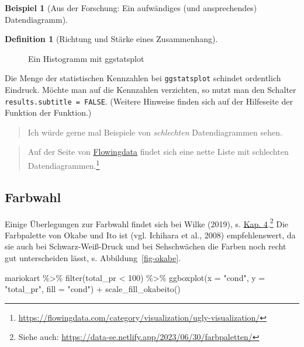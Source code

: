 \documentclass[
  a4paper,
]{scrbook}
\newenvironment{Shaded}{\begin{snugshade}}{\end{snugshade}}
\newcommand{\AttributeTok}[1]{\textcolor[rgb]{0.40,0.45,0.13}{#1}}
\newcommand{\DecValTok}[1]{\textcolor[rgb]{0.68,0.00,0.00}{#1}}
\newcommand{\FunctionTok}[1]{\textcolor[rgb]{0.28,0.35,0.67}{#1}}
\newcommand{\NormalTok}[1]{\textcolor[rgb]{0.00,0.23,0.31}{#1}}
\newcommand{\SpecialCharTok}[1]{\textcolor[rgb]{0.37,0.37,0.37}{#1}}
\newcommand{\StringTok}[1]{\textcolor[rgb]{0.13,0.47,0.30}{#1}}
\theoremstyle{definition}
\newtheorem{example}{Beispiel}[chapter]
\theoremstyle{definition}
\newtheorem{definition}{Definition}[chapter]
\theoremstyle{definition}
\theoremstyle{remark}
\begin{document}
\begin{example}[Aus der Forschung: Ein aufwändiges (und ansprechendes)
Datendiagramm]
\begin{definition}[Richtung und Stärke eines
Zusammenhang]
\begin{figure}[H]
{}

\caption{\label{fig-ggstatsplot}Ein Histogramm mit ggstatsplot}

\end{figure}%

Die Menge der statistischen Kennzahlen bei \texttt{ggstatsplot} schindet
ordentlich Eindruck. Möchte man auf die Kennzahlen verzichten, so nutzt
man den Schalter \texttt{results.subtitle\ =\ FALSE}. (Weitere Hinweise
finden sich auf der Hilfeseite der Funktion der Funktion.)

\begin{quote}
{} Ich würde gerne mal Beispiele von \emph{schlechten}
Datendiagrammen sehen.
\end{quote}

\begin{quote}
{} Auf der Seite von
\href{https://flowingdata.com/category/visualization/ugly-visualization/}{Flowingdata}
findet sich eine nette Liste mit schlechten Datendiagrammen.\footnote{\url{https://flowingdata.com/category/visualization/ugly-visualization/}}
\end{quote}

\subsection{Farbwahl}\label{sec-farbwahl}

Einige Überlegungen zur Farbwahl findet sich bei Wilke (2019), s.
\href{https://clauswilke.com/dataviz/color-basics.html}{Kap.
4}.\footnote{Siehe auch:
  \url{https://data-se.netlify.app/2023/06/30/farbpaletten/}} Die
Farbpalette von Okabe und Ito ist (vgl. Ichihara et al., 2008)
empfehlenswert, da sie auch bei Schwarz-Weiß-Druck und bei Sehschwächen
die Farben noch recht gut unterscheiden lässt, s.
Abbildung~\ref{fig-okabe}.

\begin{Shaded}
\begin{Highlighting}[]
\NormalTok{mariokart }\SpecialCharTok{\%\textgreater{}\%} 
  \FunctionTok{filter}\NormalTok{(total\_pr }\SpecialCharTok{\textless{}} \DecValTok{100}\NormalTok{) }\SpecialCharTok{\%\textgreater{}\%} 
  \FunctionTok{ggboxplot}\NormalTok{(}\AttributeTok{x =} \StringTok{"cond"}\NormalTok{, }\AttributeTok{y =} \StringTok{"total\_pr"}\NormalTok{, }\AttributeTok{fill =} \StringTok{"cond"}\NormalTok{) }\SpecialCharTok{+}
  \FunctionTok{scale\_fill\_okabeito}\NormalTok{()}
\end{Highlighting}
\end{Shaded}


\end{definition}
\end{example}
\end{document}
